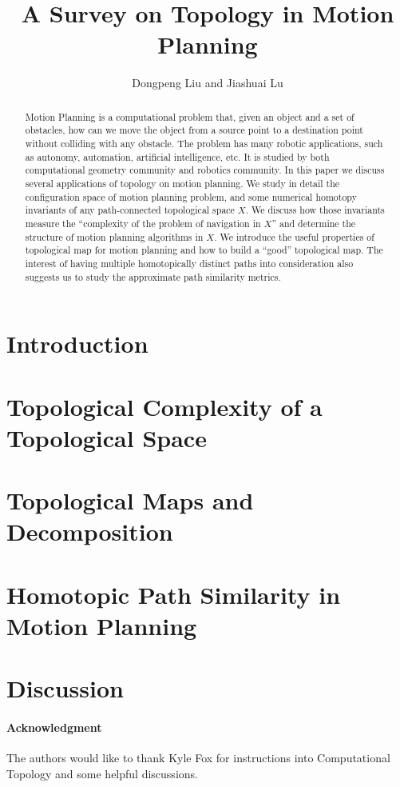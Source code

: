 \documentclass[12pt,twoside]{article}
\begin{document}
\title{A Survey on Topology in Motion Planning}

\author{
Dongpeng Liu %
and Jiashuai Lu%
}


\maketitle

%
\begin{abstract}
  Motion Planning is a computational problem that, given an object and a set of obstacles, how can we move the object from a source point to a destination point without colliding with any obstacle.
  The problem has many robotic applications, such as autonomy, automation, artificial intelligence, etc. It is studied by both computational geometry community and robotics community.
  In this paper we discuss several applications of topology on motion planning.
  We study in detail the configuration space of motion planning problem, and some numerical homotopy invariants of any path-connected topological space \(X\). We discuss how those invariants measure the ``complexity of the problem of navigation in \(X\)'' and determine the structure of motion planning algorithms in \(X\).
  We introduce the useful properties of topological map for motion planning and how to build a ``good'' topological map. The interest of having multiple homotopically distinct paths into consideration also suggests us to study the approximate path similarity metrics.
\end{abstract}

\setcounter{page}{1}

\section{Introduction}\label{sec:intro}


\section{Topological Complexity of a Topological Space}\label{sec:complexity}

\section{Topological Maps and Decomposition}\label{sec:decomposition}

\section{Homotopic Path Similarity in Motion Planning}\label{sec:sim}

\section{Discussion}\label{sec:dis}

\paragraph*{Acknowledgment} The authors would like to thank Kyle Fox for instructions into Computational Topology and some helpful discussions.



\end{document}
